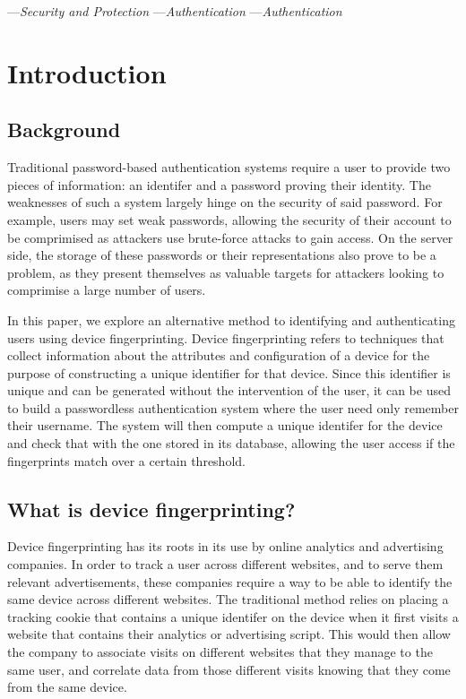 \documentclass{acm_proc_article-sp}
\begin{document}

---\textit{Security and Protection}
---\textit{Authentication}
---\textit{Authentication}



\section{Introduction}
\subsection{Background}
Traditional password-based authentication systems require a user to provide two pieces of information: an identifer and a password proving their identity. The weaknesses of such a system largely hinge on the security of said password. For example, users may set weak passwords, allowing the security of their account to be comprimised as attackers use brute-force attacks to gain access. On the server side, the storage of these passwords or their representations also prove to be a problem, as they present themselves as valuable targets for attackers looking to comprimise a large number of users.

In this paper, we explore an alternative method to identifying and authenticating users using device fingerprinting. Device fingerprinting refers to techniques that collect information about the attributes and configuration of a device for the purpose of constructing a unique identifier for that device. Since this identifier is unique and can be generated without the intervention of the user, it can be used to build a passwordless authentication system where the user need only remember their username. The system will then compute a unique identifer for the device and check that with the one stored in its database, allowing the user access if the fingerprints match over a certain threshold.

\subsection{What is device fingerprinting?}
Device fingerprinting has its roots in its use by online analytics and advertising companies. In order to track a user across different websites, and to serve them relevant advertisements, these companies require a way to be able to identify the same device across different websites. The traditional method relies on placing a tracking cookie that contains a unique identifer on the device when it first visits a website that contains their analytics or advertising script. This would then allow the company to associate visits on different websites that they manage to the same user, and correlate data from those different visits knowing that they come from the same device.
\end{document}
